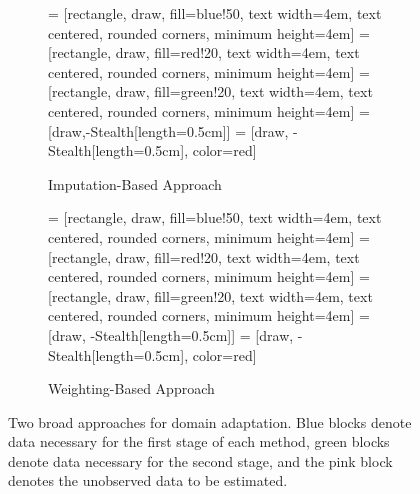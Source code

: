 \documentclass{article} %
\begin{document}
\begin{figure}
\begin{subfigure}{.5\textwidth}
     = [rectangle, draw, fill=blue!50, 
    text width=4em, text centered, rounded corners, minimum height=4em]
     = [rectangle, draw, fill=red!20, 
    text width=4em, text centered, rounded corners, minimum height=4em]
     = [rectangle, draw, fill=green!20, 
    text width=4em, text centered, rounded corners, minimum height=4em]
     = [draw,-{Stealth[length=0.5cm]}]
     = [draw, -{Stealth[length=0.5cm]}, color=red]
    \caption{Imputation-Based Approach}
    \label{fig:imp}
\end{subfigure}
\begin{subfigure}{.5\textwidth}
     = [rectangle, draw, fill=blue!50, 
    text width=4em, text centered, rounded corners, minimum height=4em]
     = [rectangle, draw, fill=red!20, 
    text width=4em, text centered, rounded corners, minimum height=4em]
     = [rectangle, draw, fill=green!20, 
    text width=4em, text centered, rounded corners, minimum height=4em]
     = [draw, -{Stealth[length=0.5cm]}]
     = [draw, -{Stealth[length=0.5cm]}, color=red]
    \caption{Weighting-Based Approach}
    \label{fig:ps}
\end{subfigure}
\caption{Two broad approaches for domain adaptation. Blue blocks denote data necessary for the first stage of each method, green blocks denote data necessary for the second stage, and the pink block denotes the unobserved data to be estimated.}
\label{fig:approaches}
\end{figure}
\end{document}
